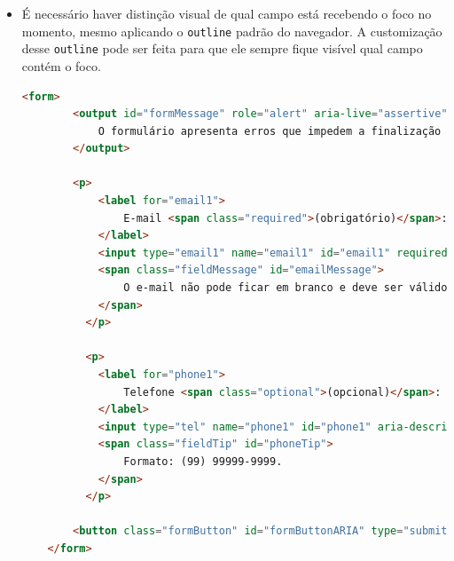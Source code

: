 {\begin{itemize}
\begin{itemize}
        \item A indicação do erro é feita de três formas: com uma cor, um texto informativo e um ícone de alerta. Assim, não usamos somente uma forma para representar esta informação, beneficiando pessoas sem deficiência visual, com deficiências cognitivas, que usam leitor de telas ou que possuem daltonismo;
        \item Uma área para mensagem informativa em um formulário sempre será bem-vinda. Esta área de mensagem informativa do formulário possui os atributos \lstinline{role="alert"}, que avisa que é uma mensagem de alerta e \lstinline{aria-live="assertive"} que informa que é um campo que pode sofrer modificações no conteúdo e o leitor de telas é informado quando há modificação neste campo;
    \end{itemize}
    \item É necessário haver distinção visual de qual campo está recebendo o foco no momento, mesmo aplicando o \lstinline{outline} padrão do navegador. A customização desse \lstinline{outline} pode ser feita para que ele sempre fique visível qual campo contém o foco.
    
    {\begin{lstlisting}[language=html, caption=Formulário acessível]
    <form>
        <output id="formMessage" role="alert" aria-live="assertive" tabindex="0" class="error">
            O formulário apresenta erros que impedem a finalização do seu cadastro. Confira se todos os campos obrigatórios foram preenchidos e tente novamente.
        </output>

        <p>
            <label for="email1">
                E-mail <span class="required">(obrigatório)</span>:
            </label>
            <input type="email1" name="email1" id="email1" required="" aria-invalid="true" aria-describedby="emailMessage">
            <span class="fieldMessage" id="emailMessage">
                O e-mail não pode ficar em branco e deve ser válido.
            </span>
          </p>
  
          <p>
            <label for="phone1">
                Telefone <span class="optional">(opcional)</span>:
            </label>
            <input type="tel" name="phone1" id="phone1" aria-describedby="phoneTip">
            <span class="fieldTip" id="phoneTip">
                Formato: (99) 99999-9999.
            </span>
          </p>

        <button class="formButton" id="formButtonARIA" type="submit">Finalizar cadastro</button>
    </form>
    \end{lstlisting}}
    

\end{itemize}}
